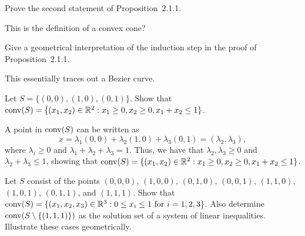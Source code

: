 \begin{exercise}
  Prove the second statement of Proposition~2.1.1.
\end{exercise}

\begin{solution}
  This is the definition of a convex cone?
\end{solution}

\begin{exercise}
  Give a geometrical interpretation of the induction step in the proof of Proposition~2.1.1.
\end{exercise}

\begin{solution}
  This essentially traces out a Bezier curve.
\end{solution}

\begin{exercise}
  Let $S = \{ (0, 0), (1, 0), (0, 1) \}$.
  Show that $\operatorname*{conv}(S) = \{ (x_1, x_2) \in \mathbb{R}^2 : x_1 \geq 0, x_2 \geq 0, x_1 + x_2 \leq 1 \}$.
\end{exercise}

\begin{solution}
  A point in $\operatorname*{conv}(S)$ can be written as
  \begin{equation}
    x
    = \lambda_1 (0, 0) + \lambda_2 (1, 0) + \lambda_3 (0, 1)
    = (\lambda_2, \lambda_3),
  \end{equation}
  where $\lambda_i \geq 0$ and $\lambda_1 + \lambda_2 + \lambda_3 = 1$.
  Thus, we have that $\lambda_2, \lambda_3 \geq 0$ and $\lambda_2 + \lambda_3 \leq 1$, showing that $\operatorname*{conv}(S) = \{ (x_1, x_2) \in \mathbb{R}^2 : x_1 \geq 0, x_2 \geq 0, x_1 + x_2 \leq 1 \}$.
\end{solution}

\begin{exercise}
  Let $S$ consist of the points $(0, 0, 0)$, $(1, 0, 0)$, $(0, 1, 0)$, $(0, 0, 1)$, $(1, 1, 0)$, $(1, 0, 1)$, $(0, 1, 1)$, and $(1, 1, 1)$.
  Show that $\operatorname*{conv}(S) = \{ (x_1, x_2, x_3) \in \mathbb{R}^3 : 0 \leq x_i \leq 1 \text{ for } i = 1, 2, 3 \}$.
  Also determine $\operatorname*{conv}(S \setminus \{(1, 1, 1)\})$ as the solution set of a system of linear inequalities.
  Illustrate these cases geometrically.
\end{exercise}

